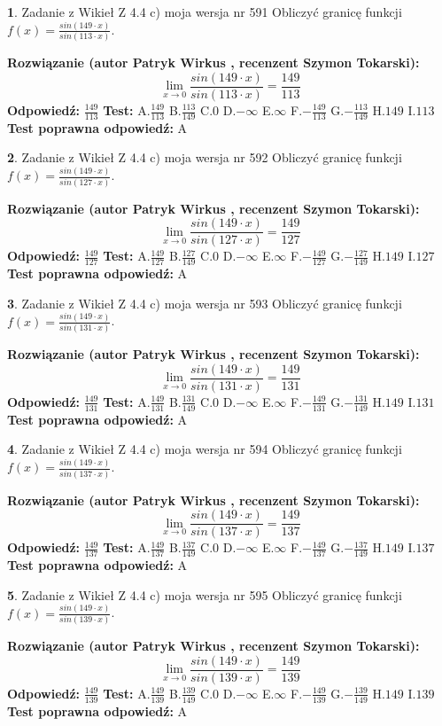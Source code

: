 \documentclass[12pt, a4paper]{article}
\theoremstyle{definition} %
\newtheorem{zad}{}
\newcommand{\zadStart}[1]{\begin{zad}#1\newline}
\newcommand{\zadStop}{\end{zad}}
\newcommand{\rozwStart}[2]{\noindent \textbf{Rozwiązanie (autor #1 , recenzent #2): }\newline}
\newcommand{\rozwStop}{\newline}
\newcommand{\odpStart}{\noindent \textbf{Odpowiedź:}\newline}
\newcommand{\odpStop}{\newline}
\newcommand{\testStart}{\noindent \textbf{Test:}\newline}
\newcommand{\testStop}{\newline}
\newcommand{\kluczStart}{\noindent \textbf{Test poprawna odpowiedź:}\newline}
\newcommand{\kluczStop}{\newline}
\begin{document}
\zadStart{Zadanie z Wikieł Z 4.4 c) moja wersja nr 591}
Obliczyć granicę funkcji $f(x)=\frac{sin(149\cdot x)}{sin(113\cdot x)}$.
\zadStop
\rozwStart{Patryk Wirkus}{Szymon Tokarski}
$$\lim\limits_{x\to 0}\frac{sin(149\cdot x)}{sin(113\cdot x)}=
\frac{149}{113}$$
\rozwStop
\odpStart
$\frac{149}{113}$
\odpStop
\testStart
A.$\frac{149}{113}$
B.$\frac{113}{149}$
C.$0$
D.$-\infty$
E.$\infty$
F.$-\frac{149}{113}$
G.$-\frac{113}{149}$
H.$149$
I.$113$
\testStop
\kluczStart
A
\kluczStop



\zadStart{Zadanie z Wikieł Z 4.4 c) moja wersja nr 592}
Obliczyć granicę funkcji $f(x)=\frac{sin(149\cdot x)}{sin(127\cdot x)}$.
\zadStop
\rozwStart{Patryk Wirkus}{Szymon Tokarski}
$$\lim\limits_{x\to 0}\frac{sin(149\cdot x)}{sin(127\cdot x)}=
\frac{149}{127}$$
\rozwStop
\odpStart
$\frac{149}{127}$
\odpStop
\testStart
A.$\frac{149}{127}$
B.$\frac{127}{149}$
C.$0$
D.$-\infty$
E.$\infty$
F.$-\frac{149}{127}$
G.$-\frac{127}{149}$
H.$149$
I.$127$
\testStop
\kluczStart
A
\kluczStop



\zadStart{Zadanie z Wikieł Z 4.4 c) moja wersja nr 593}
Obliczyć granicę funkcji $f(x)=\frac{sin(149\cdot x)}{sin(131\cdot x)}$.
\zadStop
\rozwStart{Patryk Wirkus}{Szymon Tokarski}
$$\lim\limits_{x\to 0}\frac{sin(149\cdot x)}{sin(131\cdot x)}=
\frac{149}{131}$$
\rozwStop
\odpStart
$\frac{149}{131}$
\odpStop
\testStart
A.$\frac{149}{131}$
B.$\frac{131}{149}$
C.$0$
D.$-\infty$
E.$\infty$
F.$-\frac{149}{131}$
G.$-\frac{131}{149}$
H.$149$
I.$131$
\testStop
\kluczStart
A
\kluczStop



\zadStart{Zadanie z Wikieł Z 4.4 c) moja wersja nr 594}
Obliczyć granicę funkcji $f(x)=\frac{sin(149\cdot x)}{sin(137\cdot x)}$.
\zadStop
\rozwStart{Patryk Wirkus}{Szymon Tokarski}
$$\lim\limits_{x\to 0}\frac{sin(149\cdot x)}{sin(137\cdot x)}=
\frac{149}{137}$$
\rozwStop
\odpStart
$\frac{149}{137}$
\odpStop
\testStart
A.$\frac{149}{137}$
B.$\frac{137}{149}$
C.$0$
D.$-\infty$
E.$\infty$
F.$-\frac{149}{137}$
G.$-\frac{137}{149}$
H.$149$
I.$137$
\testStop
\kluczStart
A
\kluczStop



\zadStart{Zadanie z Wikieł Z 4.4 c) moja wersja nr 595}
Obliczyć granicę funkcji $f(x)=\frac{sin(149\cdot x)}{sin(139\cdot x)}$.
\zadStop
\rozwStart{Patryk Wirkus}{Szymon Tokarski}
$$\lim\limits_{x\to 0}\frac{sin(149\cdot x)}{sin(139\cdot x)}=
\frac{149}{139}$$
\rozwStop
\odpStart
$\frac{149}{139}$
\odpStop
\testStart
A.$\frac{149}{139}$
B.$\frac{139}{149}$
C.$0$
D.$-\infty$
E.$\infty$
F.$-\frac{149}{139}$
G.$-\frac{139}{149}$
H.$149$
I.$139$
\testStop
\kluczStart
A
\kluczStop
\end{document}

